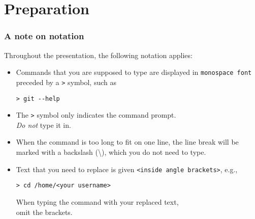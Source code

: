 \section{Preparation}

\begin{frame}[fragile]

\frametitle{A note on notation}
	
Throughout the presentation, the following notation applies:

\begin{itemize}
	\item Commands that you are supposed to type are displayed in \texttt{monospace font} preceded by a \texttt{>} symbol, such as
	\begin{verbatim}
> git --help
	\end{verbatim}
	\item The \texttt{>} symbol only indicates the command prompt.\\ \textit{Do not} type it in.
	\item When the command is too long to fit on one line, the line break will be marked with a backslash (\textbackslash), which you do not need to type.
	\item Text that you need to replace is given \texttt{<inside angle brackets>}, e.g.,
	\begin{verbatim}
> cd /home/<your username>
	\end{verbatim}
	When typing the command with your replaced text,\\omit the brackets.
\end{itemize}

\end{frame}



